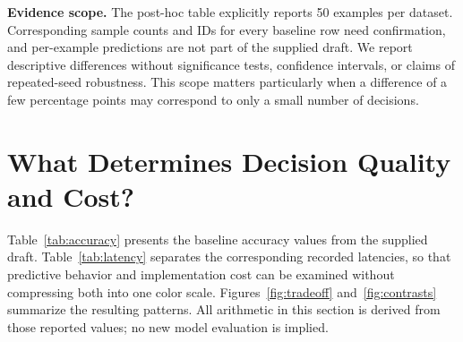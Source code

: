 \textbf{Evidence scope.} The post-hoc table explicitly reports 50 examples per dataset. Corresponding sample counts and IDs for every baseline row need confirmation, and per-example predictions are not part of the supplied draft. We report descriptive differences without significance tests, confidence intervals, or claims of repeated-seed robustness. This scope matters particularly when a difference of a few percentage points may correspond to only a small number of decisions.

\section{What Determines Decision Quality and Cost?}
\label{sec:results}

Table~\ref{tab:accuracy} presents the baseline accuracy values from the supplied draft. Table~\ref{tab:latency} separates the corresponding recorded latencies, so that predictive behavior and implementation cost can be examined without compressing both into one color scale. Figures~\ref{fig:tradeoff} and~\ref{fig:contrasts} summarize the resulting patterns. All arithmetic in this section is derived from those reported values; no new model evaluation is implied.

